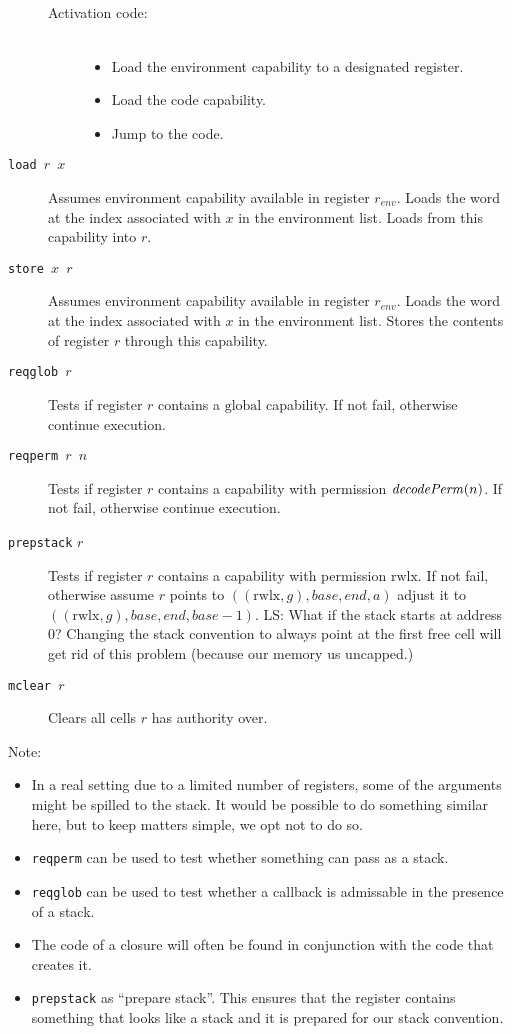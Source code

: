 \documentclass[a4paper]{article}
\newcommand{\forcenewline}{$\phantom{v}$\\}
\newcommand\lau[1]{{\color{purple} \sf \footnotesize {LS: #1}}\\}
\newcommand{\var}[1]{\mathit{#1}}
\newcommand{\gl}{\var{g}}
\newcommand{\addr}{\var{a}}
\newcommand{\start}{\var{base}}
\newcommand{\addrend}{\var{end}}
\newcommand{\plainfun}[2]{
  \ifthenelse{\equal{#2}{}}
  {\mathit{#1}}
  {\mathit{#1}(#2)}
}
\newcommand{\decodePerm}[1]{\plainfun{decodePerm}{#1}}
\newcommand{\plainperm}[1]{\mathrm{#1}}
\newcommand{\rwlx}{\plainperm{rwlx}}
\newcommand{\glob}{\plainperm{global}}
\begin{document}
\begin{description}
\begin{description}
  \item[Activation code:] \forcenewline
    \begin{itemize}
    \item Load the environment capability to a designated register.
    \item Load the code capability.
    \item Jump to the code.
    \end{itemize}
  \end{description}
\item[\texttt{load $r$ $x$}] Assumes environment capability available in register $r_{\var{env}}$. Loads the word at the index associated with $x$ in the environment list. Loads from this capability into $r$.
\item[\texttt{store $x$ $r$}] Assumes environment capability available in register $r_{\var{env}}$. Loads the word at the index associated with $x$ in the environment list. Stores the contents of register $r$ through this capability.
\item[\texttt{reqglob $r$}] Tests if register $r$ contains a $\glob$ capability. If not fail, otherwise continue execution.
\item[\texttt{reqperm $r$ $n$}] Tests if register $r$ contains a capability with permission $\decodePerm{n}$. If not fail, otherwise continue execution.
\item[\texttt{prepstack} $r$] Tests if register $r$ contains a capability with permission $\rwlx$. If not fail, otherwise assume $r$ points to $((\rwlx,\gl),\start,\addrend,\addr)$ adjust it to $((\rwlx,\gl),\start,\addrend,\start - 1)$. 
  \lau{What if the stack starts at address 0? Changing the stack convention to always point at the first free cell will get rid of this problem (because our memory us uncapped.)}
\item[\texttt{mclear $r$}] Clears all cells $r$ has authority over. 
\end{description}
Note:
\begin{itemize}
\item In a real setting due to a limited number of registers, some of the arguments might be spilled to the stack. It would be possible to do something similar here, but to keep
  matters simple, we opt not to do so.
\item \texttt{reqperm} can be used to test whether something can pass as a stack.
\item \texttt{reqglob} can be used to test whether a callback is admissable in the presence of a stack.
\item The code of a closure will often be found in conjunction with the code that creates it.
\item \texttt{prepstack} as ``prepare stack''. This ensures that the register contains something that looks like a stack and it is prepared for our stack convention.
\end{itemize}
\end{document}
